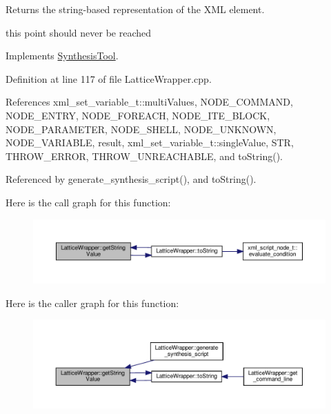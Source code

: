Returns the string-\/based representation of the X\+ML element. 

this point should never be reached 

Implements \hyperlink{classSynthesisTool_a730699a51a36280c89b32f324dedc1a7}{Synthesis\+Tool}.



Definition at line 117 of file Lattice\+Wrapper.\+cpp.



References xml\+\_\+set\+\_\+variable\+\_\+t\+::multi\+Values, N\+O\+D\+E\+\_\+\+C\+O\+M\+M\+A\+ND, N\+O\+D\+E\+\_\+\+E\+N\+T\+RY, N\+O\+D\+E\+\_\+\+F\+O\+R\+E\+A\+CH, N\+O\+D\+E\+\_\+\+I\+T\+E\+\_\+\+B\+L\+O\+CK, N\+O\+D\+E\+\_\+\+P\+A\+R\+A\+M\+E\+T\+ER, N\+O\+D\+E\+\_\+\+S\+H\+E\+LL, N\+O\+D\+E\+\_\+\+U\+N\+K\+N\+O\+WN, N\+O\+D\+E\+\_\+\+V\+A\+R\+I\+A\+B\+LE, result, xml\+\_\+set\+\_\+variable\+\_\+t\+::single\+Value, S\+TR, T\+H\+R\+O\+W\+\_\+\+E\+R\+R\+OR, T\+H\+R\+O\+W\+\_\+\+U\+N\+R\+E\+A\+C\+H\+A\+B\+LE, and to\+String().



Referenced by generate\+\_\+synthesis\+\_\+script(), and to\+String().

Here is the call graph for this function\+:
\nopagebreak
\begin{figure}[H]
\begin{center}
\leavevmode
\includegraphics[width=350pt]{d4/d55/classLatticeWrapper_a93a496eef88f096b8405503966a15a2d_cgraph}
\end{center}
\end{figure}
Here is the caller graph for this function\+:
\nopagebreak
\begin{figure}[H]
\begin{center}
\leavevmode
\includegraphics[width=350pt]{d4/d55/classLatticeWrapper_a93a496eef88f096b8405503966a15a2d_icgraph}
\end{center}
\end{figure}
\mbox{\label{classLatticeWrapper_a0c5cd7306773dc6c6e0250141f78760c}} 
